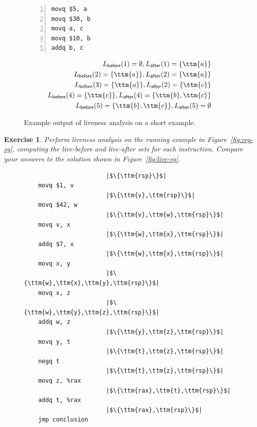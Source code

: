 \documentclass[11pt]{book}
\newtheorem{exercise}[theorem]{Exercise}
\begin{document}
{\begin{figure}[tbp]
\begin{minipage}{0.45\textwidth}
\begin{lstlisting}[numbers=left,numberstyle=\tiny]
movq $5, a
movq $30, b
movq a, c
movq $10, b
addq b, c
\end{lstlisting}
\end{minipage}
\vrule\hspace{10pt}
\begin{minipage}{0.45\textwidth}
\begin{align*}
L_{\mathsf{before}}(1)=  \emptyset, 
L_{\mathsf{after}}(1)=  \{\ttm{a}\}\\
L_{\mathsf{before}}(2)=  \{\ttm{a}\},
L_{\mathsf{after}}(2)=  \{\ttm{a}\}\\
L_{\mathsf{before}}(3)=  \{\ttm{a}\},
L_{\mathsf{after}}(2)=  \{\ttm{c}\}\\
L_{\mathsf{before}}(4)=  \{\ttm{c}\},
L_{\mathsf{after}}(4)=  \{\ttm{b},\ttm{c}\}\\
L_{\mathsf{before}}(5)=  \{\ttm{b},\ttm{c}\},
L_{\mathsf{after}}(5)=  \emptyset
\end{align*}
\end{minipage}
\caption{Example output of liveness analysis on a short example.}
\label{fig:liveness-example-0}
\end{figure}

\begin{exercise}\normalfont
  Perform liveness analysis on the running example in
  Figure~\ref{fig:reg-eg}, computing the live-before and live-after
  sets for each instruction. Compare your answers to the solution
  shown in Figure~\ref{fig:live-eg}.
\end{exercise}

\begin{figure}[tp]
\hspace{20pt}
\begin{minipage}{0.45\textwidth}
\begin{lstlisting}
                       |$\{\ttm{rsp}\}$|    
    movq $1, v
                       |$\{\ttm{v},\ttm{rsp}\}$|    
    movq $42, w
                       |$\{\ttm{v},\ttm{w},\ttm{rsp}\}$|    
    movq v, x
                       |$\{\ttm{w},\ttm{x},\ttm{rsp}\}$|    
    addq $7, x
                       |$\{\ttm{w},\ttm{x},\ttm{rsp}\}$|    
    movq x, y
                       |$\{\ttm{w},\ttm{x},\ttm{y},\ttm{rsp}\}$|    
    movq x, z
                       |$\{\ttm{w},\ttm{y},\ttm{z},\ttm{rsp}\}$|    
    addq w, z
                       |$\{\ttm{y},\ttm{z},\ttm{rsp}\}$|
    movq y, t
                       |$\{\ttm{t},\ttm{z},\ttm{rsp}\}$|    
    negq t
                       |$\{\ttm{t},\ttm{z},\ttm{rsp}\}$|    
    movq z, %rax
                       |$\{\ttm{rax},\ttm{t},\ttm{rsp}\}$|    
    addq t, %rax
                       |$\{\ttm{rax},\ttm{rsp}\}$|
    jmp conclusion
\end{lstlisting}
\end{minipage}


\end{figure}}
\end{document}
